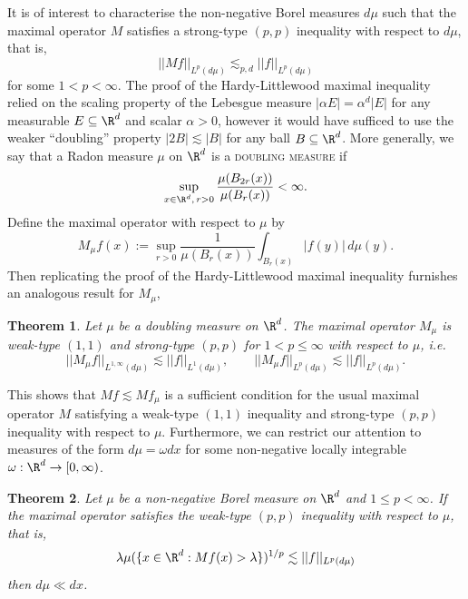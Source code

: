 \documentclass[reqno]{amsart}
\newtheorem{theorem}{Theorem}
\theoremstyle{definition}
\theoremstyle{remark}
\renewcommand{\emph}{\textsc}
\begin{document}
It is of interest to characterise the non-negative Borel measures $d \mu$ such that the maximal operator $M$ satisfies a strong-type $(p, p)$ inequality with respect to $d \mu$, that is, 
	\[ ||M f||_{L^p (d \mu)} \lesssim_{p, d} ||f||_{L^p (d\mu)} \]
for some $1 < p < \infty$. The proof of the Hardy-Littlewood maximal inequality relied on the scaling property of the Lebesgue measure $|\alpha E| = \alpha^d |E|$ for any measurable $E \subseteq \R^d$ and scalar $\alpha > 0$, however it would have sufficed to use the weaker ``doubling'' property $|2 B| \lesssim |B|$ for any ball $B \subseteq \R^d$. More generally, we say that a Radon measure $\mu$ on $\R^d$ is a \emph{doubling measure} if
	\[ \sup_{x \in \R^d,  \, r > 0} \frac{\mu(B_{2r} (x))}{\mu(B_r (x))} < \infty. \]
Define the maximal operator with respect to $\mu$ by 
	\[ M_\mu f(x) := \sup_{r > 0} \frac{1}{\mu(B_r (x))} \int_{B_r (x)} |f(y)| \, d \mu(y).\]
Then replicating the proof of the Hardy-Littlewood maximal inequality furnishes an analogous result for $M_\mu$, 

\begin{theorem}
	Let $\mu$ be a doubling measure on $\R^d$. The maximal operator $M_\mu$ is	weak-type $(1, 1)$ and strong-type $(p, p)$ for $1 < p \leq \infty$ with respect to $\mu$, i.e.
	\[ ||M_\mu f||_{L^{1, \infty} (d \mu)} \lesssim ||f||_{L^1 (d\mu)}, \qquad ||M_\mu f||_{L^{p}(d \mu)} \lesssim ||f||_{L^p (d\mu)}. \]\label{thm:maxdouble}
\end{theorem}	
This shows that $M f \lesssim Mf_\mu$ is a sufficient condition for the usual maximal operator $M$ satisfying a weak-type $(1, 1)$ inequality and strong-type $(p, p)$ inequality with respect to $\mu$. Furthermore, we can restrict our attention to measures of the form $d \mu = \omega dx$ for some non-negative locally integrable $\omega : \R^d \to [0, \infty)$. 

\begin{theorem}
	Let $\mu$ be a non-negative Borel measure on $\R^d$ and $1 \leq p < \infty$. If the maximal operator satisfies the weak-type $(p, p)$ inequality with respect to $\mu$, that is, 
		\[ \lambda \mu(\{ x \in \R^d : Mf (x) > \lambda \})^{1/p} \lesssim ||f||_{L^p (d\mu)} \]
	then $d\mu  \ll d x$. 	
\end{theorem}
\end{document}
